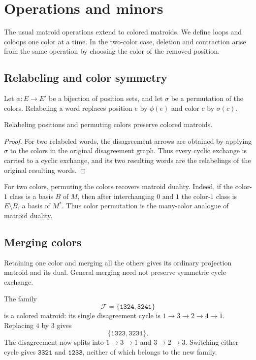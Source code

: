 
\section[operations]{Operations and minors}

The usual matroid operations extend to colored matroids. We define loops and
coloops one color at a time. In the two-color case, deletion and contraction
arise from the same operation by choosing the color of the removed position.

\subsection[symmetries]{Relabeling and color symmetry}

Let $\phi\colon E\to E'$ be a bijection of position sets, and let $\sigma$ be
a permutation of the colors. Relabeling a word replaces position $e$ by
$\phi(e)$ and color $c$ by $\sigma(c)$.

\begin{proposition}[Relabeling]
Relabeling positions and permuting colors preserve colored matroids.
\end{proposition}

\begin{proof}
For two relabeled words, the disagreement arrows are obtained by applying
$\sigma$ to the colors in the original disagreement graph. Thus every cyclic
exchange is carried to a cyclic exchange, and its two resulting words are the
relabelings of the original resulting words.
\end{proof}

For two colors, permuting the colors recovers matroid duality. Indeed, if the
color-$1$ class is a basis $B$ of $M$, then after interchanging $0$ and $1$
the color-$1$ class is $E\setminus B$, a basis of $M^*$. Thus color
permutation is the many-color analogue of matroid duality.

\subsection[colorMerging]{Merging colors}

Retaining one color and merging all the others gives its ordinary
projection matroid and its dual. General merging need not preserve
symmetric cycle exchange.

\begin{example}
The family
\[
 \mathcal F=\{\mathtt{1324},\mathtt{3241}\}
\]
is a colored matroid: its single disagreement cycle is
$1\to3\to2\to4\to1$. Replacing $4$ by $3$ gives
\[
 \{\mathtt{1323},\mathtt{3231}\}.
\]
The disagreement now splits into $1\to3\to1$ and $3\to2\to3$.
Switching either cycle gives $\mathtt{3321}$ and $\mathtt{1233}$,
neither of which belongs to the new family.
\end{example}

